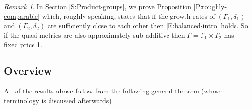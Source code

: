 \documentclass[12pt]{article}
\theoremstyle{plain}
\newtheorem{thm}{Theorem}[section]
\theoremstyle{definition}
\newtheorem{defn}{Definition}
\theoremstyle{remark}
\newtheorem{remark}{Remark}
\newcommand{\G}{\Gamma}
\newcommand{\eps}{\epsilon}
\renewcommand\a{\alpha}
\begin{document}
\begin{remark}
  In Section  \ref{S:Product-groups}, we prove Proposition \ref{P:roughly-comparable} which, roughly speaking, states that if the growth rates of $(\G_1,d_1)$ and $(\G_2,d_2)$ are sufficiently close to each other then \eqref{E:balanced-intro} holds. So if the quasi-metrics are also approximately sub-additive then $\G=\G_1\times \G_2$ has fixed price 1.
\end{remark}





 




\subsection{Overview}

All of the results above follow from the following general theorem (whose terminology is discussed afterwards)
\end{document}
